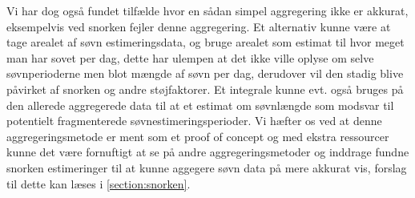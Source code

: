 Vi har dog også fundet tilfælde hvor en sådan simpel aggregering ikke er akkurat, eksempelvis ved snorken fejler denne aggregering.
Et alternativ kunne være at tage arealet af søvn estimeringsdata, og bruge arealet som estimat til hvor meget man har sovet per dag, dette har ulempen at det ikke ville oplyse om selve søvnperioderne men blot mængde af søvn per dag, derudover vil den stadig blive påvirket af snorken og andre støjfaktorer.
Et integrale kunne evt. også bruges på den allerede aggregerede data til at et estimat om søvnlængde som modsvar til potentielt fragmenterede søvnestimeringsperioder.
Vi hæfter os ved at denne aggregeringsmetode er ment som et proof of concept og med ekstra ressourcer kunne det være fornuftigt at se på andre aggregeringsmetoder og inddrage fundne snorken estimeringer til at kunne aggegere søvn data på mere akkurat vis, forslag til dette kan læses i \cref{section:snorken}.




